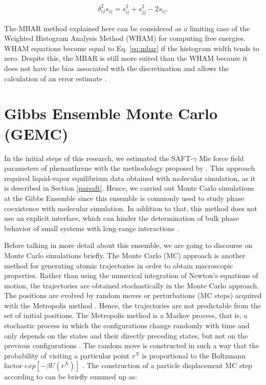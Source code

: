 \begin{equation}
\begin{aligned}
\delta _{ij}^{2} s_{ij} = s_{ii}^{2} + s_{jj}^{2} - 2 s_{ij}.
\end{aligned}
\end{equation}

The MBAR method explained here can be considered as a limiting case of the 
Weighted Histogram Analysis Method (WHAM) \cite{wham} for computing free energies. WHAM equations become equal to Eq. \eqref{eq:mbar} if the histogram width tends to zero. Despite this, the MBAR is still more suited than the WHAM because it does not have the bias associated with the discretization and allows the calculation of an error estimate \cite{mbar}.

\section{Gibbs Ensemble Monte Carlo (GEMC)}\label{gemc}

In the initial steps of this research, we estimated the SAFT-$\gamma$ Mie force field parameters of phenanthrene with the methodology proposed by . This approach required liquid-vapor equilibrium data obtained with molecular simulation, as it is described in Section \ref{parsaft}. Hence, we carried out Monte Carlo simulations at the Gibbs Ensemble \cite{papa1987} since this ensemble is commonly used to study phase coexistence with molecular simulation. In addition to that, this method does not use an explicit interface, which can hinder the determination of bulk phase behavior of small systems with long-range interactions \cite{C1FD00090J}. 

Before talking in more detail about this ensemble, we are going to discourse on Monte Carlo simulations briefly. The Monte Carlo (MC) approach is another method for generating atomic trajectories in order to obtain macroscopic properties. Rather than using the numerical integration of Newton's equations of motion, the trajectories are obtained stochastically in the Monte Carlo approach. The positions are evolved by random moves or perturbations (MC steps) acquired with the Metropolis method \cite{1953JChPh..21.1087M}. Hence, the trajectories are not predictable from the set of initial positions. The Metropolis method is a Markov process, that is, a stochastic process in which the configurations change randomly with time and only depends on the states and their directly preceding states, but not on the previous configurations \cite{raabe}. The random move is constructed in such a way that the probability of visiting a particular point $r^{N}$ is proportional to the Boltzmann factor $exp[-\beta U(r^{N})]$ \cite{frenkel}. The construction of a  particle displacement MC step according to  can be briefly summed up as:

